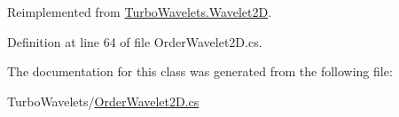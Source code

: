\-Reimplemented from \hyperlink{class_turbo_wavelets_1_1_wavelet2_d_af0339475762d327f9d8ec019079cdc28}{\-Turbo\-Wavelets.\-Wavelet2\-D}.



\-Definition at line 64 of file \-Order\-Wavelet2\-D.\-cs.



\-The documentation for this class was generated from the following file\-:\begin{DoxyCompactItemize}
\item 
\-Turbo\-Wavelets/\hyperlink{_order_wavelet2_d_8cs}{\-Order\-Wavelet2\-D.\-cs}\end{DoxyCompactItemize}
